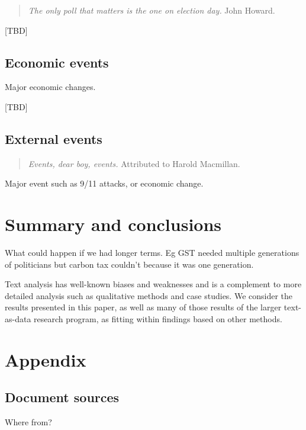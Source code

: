 \documentclass[12pt,]{article}
\begin{document}
\begin{quote}
\emph{The only poll that matters is the one on election day.} John
Howard.
\end{quote}

{[}TBD{]}

\subsection{Economic events}\label{economic-events}

Major economic changes.

{[}TBD{]}

\subsection{External events}\label{external-events}

\begin{quote}
\emph{Events, dear boy, events.} Attributed to Harold Macmillan.
\end{quote}

Major event such as 9/11 attacks, or economic change.

\section{Summary and conclusions}\label{summary-and-conclusions}

What could happen if we had longer terms. Eg GST needed multiple
generations of politicians but carbon tax couldn't because it was one
generation.

Text analysis has well-known biases and weaknesses and is a complement
to more detailed analysis such as qualitative methods and case studies.
We consider the results presented in this paper, as well as many of
those results of the larger text-as-data research program, as fitting
within findings based on other methods.

\newpage

\section{Appendix}\label{appendix}

\subsection{Document sources}\label{document-sources}

Where from?
\end{document}
